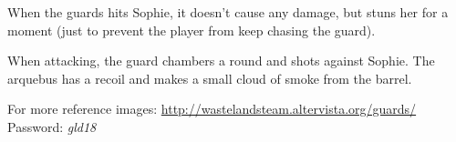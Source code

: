 When the guards hits Sophie, it doesn't cause any damage, but stuns her for a moment (just to prevent the player from keep chasing the guard).

When attacking, the guard chambers a round and shots against Sophie. The arquebus has a recoil and makes a small cloud of smoke from the barrel.

For more reference images: \url{http://wastelandsteam.altervista.org/guards/}\\
Password: \textit{gld18}
